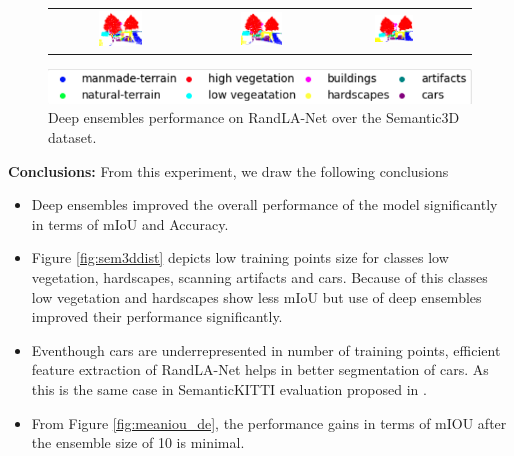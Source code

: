 \begin{figure}[h!]
\begin{tabular}{cccc}
            \includegraphics[width=0.33\textwidth, height=0.18\textheight]{images/seg_output/deep_ensembles/2_1.png} &
            \includegraphics[width=0.33\textwidth, height=0.18\textheight]{images/seg_output/deep_ensembles/2_5.png}& 
            \includegraphics[width=0.33\textwidth, height=0.18\textheight]{images/seg_output/deep_ensembles/2_10.png}\\
        \end{tabular}
        \includegraphics[scale=0.65]{images/legend.png}
        \caption{Deep ensembles performance on RandLA-Net over the Semantic3D dataset.}
    \end{figure}
    \textbf{Conclusions:}
    From this experiment, we draw the following conclusions 
    \begin{itemize}
        \item Deep ensembles improved the overall performance of the model significantly in terms of mIoU and Accuracy.
        \item Figure \ref{fig:sem3ddist} depicts low training points size for classes low vegetation, hardscapes, scanning artifacts and cars. Because of this classes low vegetation and hardscapes show less mIoU but use of deep ensembles improved their performance significantly.
        \item Eventhough cars are underrepresented in number of training points, efficient feature extraction of RandLA-Net helps in better segmentation of cars. As this is the same case in SemanticKITTI evaluation proposed in \cite{Hu_2020_CVPR_Randla}.
        \item From Figure \ref{fig:meaniou_de}, the performance gains in terms of mIOU after the ensemble size of 10 is minimal.
    \end{itemize}

